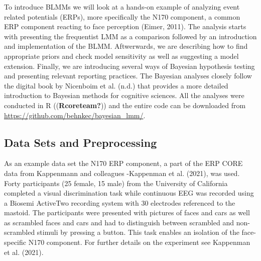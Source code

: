 \documentclass[
  doc,12pt,floatsintext]{apa7}
\begin{document}
To introduce BLMMs we will look at a hands-on example of analyzing event related potentials (ERPs), more specifically the N170 component, a common ERP component reacting to face perception (Eimer, 2011). The analysis starts with presenting the frequentist LMM as a comparison followed by an introduction and implementation of the BLMM. Aftwerwards, we are describing how to find appropriate priors and check model sensitivity as well as suggesting a model extension. Finally, we are introducing several ways of Bayesian hypothesis testing and presenting relevant reporting practices. The Bayesian analyses closely follow the digital book by Nicenboim et al. (n.d.) that provides a more detailed introduction to Bayesian methods for cognitive sciences. All the analyses were conducted in R ((\textbf{Rcoreteam?})) and the entire code can be downloaded from \url{https://github.com/behnkec/bayesian_lmm/}.

\subsection{Data Sets and Preprocessing}\label{data-sets-and-preprocessing}

As an example data set the N170 ERP component, a part of the ERP CORE data from Kappenmann and colleagues -Kappenman et al. (2021), was used. Forty participants (25 female, 15 male) from the University of California completed a visual discrimination task while continuous EEG was recorded using a Biosemi ActiveTwo recording system with 30 electrodes referenced to the mastoid. The participants were presented with pictures of faces and cars as well as scrambled faces and cars and had to distinguish between scrambled and non-scrambled stimuli by pressing a button. This task enables an isolation of the face-specific N170 component. For further details on the experiment see Kappenman et al. (2021).
\end{document}
